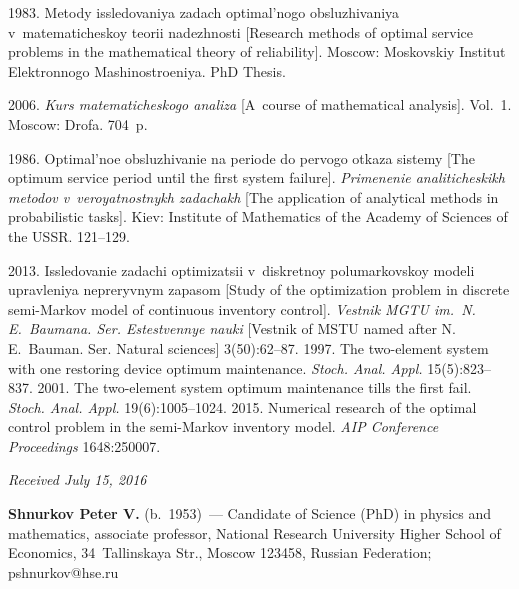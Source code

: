 \begin{multicols}{2}
{{\begin{thebibliography}{99}
\columnbreak

 1983. Metody issledovaniya zadach optimal'nogo obsluzhivaniya 
v~matematicheskoy teorii nadezhnosti [Research methods of optimal service problems 
in the mathematical theory of reliability].  
Moscow: Moskovskiy Institut Elektronnogo Mashinostroeniya.  PhD Thesis. 


 2006. 
\textit{Kurs matematicheskogo analiza} 
[A~course of mathematical analysis]. Vol.~1. Moscow: Drofa. 704~p.

 1986. Optimal'noe obsluzhivanie na periode do 
pervogo otkaza sistemy [The optimum service period until the first system failure]. 
\textit{Primenenie analiticheskikh metodov v~veroyatnostnykh zadachakh} 
[The application of analytical methods in probabilistic tasks]. Kiev:
Institute of Mathematics of the Academy of Sciences of the USSR. 121--129.

 2013. Issledovanie zadachi optimizatsii 
v~diskretnoy polumarkovskoy modeli upravleniya nepreryvnym zapasom 
[Study of the optimization problem in discrete semi-Markov model of continuous 
inventory control]. \textit{Vestnik MGTU im.\ N.\,E.~Baumana. Ser. 
Estestvennye nauki} [Vestnik of MSTU named after N.\,E.~Bauman. Ser. Natural sciences] 
3(50):62--87.
 1997. The two-element system with one restoring device 
optimum maintenance.  \textit{Stoch. Anal. Appl.} 15(5):823--837.
 2001. The two-element system optimum maintenance tills 
the first fail. \textit{Stoch. Anal. Appl.} 19(6):1005--1024.
2015. Numerical research of the optimal control problem in the semi-Markov 
inventory model. \textit{AIP Conference Proceedings} 1648:250007.
\end{thebibliography}

 }
 }

\end{multicols}

\vspace*{-3pt}

\hfill{\small\textit{Received July 15, 2016}}

\Contr

\noindent
\textbf{Shnurkov Peter V.} (b.\ 1953)~---
 Candidate of Science (PhD) in physics and mathematics, 
 associate professor, National Research University Higher School of Economics, 
 34~Tallinskaya Str., Moscow 123458, Russian Federation; \mbox{pshnurkov@hse.ru} 
 
